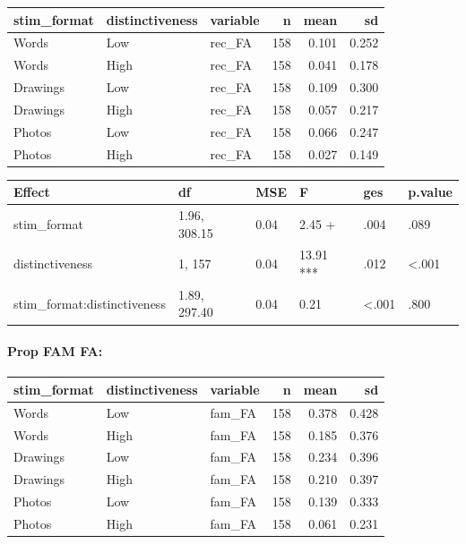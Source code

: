 \documentclass[
  11pt,
]{article}
\begin{document}
\begin{table}[!h]
\centering
\begin{tabular}{lllrrr}
\toprule
stim\_format & distinctiveness & variable & n & mean & sd\\
\midrule
Words & Low & rec\_FA & 158 & 0.101 & 0.252\\
Words & High & rec\_FA & 158 & 0.041 & 0.178\\
Drawings & Low & rec\_FA & 158 & 0.109 & 0.300\\
Drawings & High & rec\_FA & 158 & 0.057 & 0.217\\
Photos & Low & rec\_FA & 158 & 0.066 & 0.247\\
\addlinespace
Photos & High & rec\_FA & 158 & 0.027 & 0.149\\
\bottomrule
\end{tabular}
\end{table}

\begin{tabular}{l|l|l|l|l|l}
\hline
Effect & df & MSE & F & ges & p.value\\
\hline
stim\_format & 1.96, 308.15 & 0.04 & 2.45 + & .004 & .089\\
\hline
distinctiveness & 1, 157 & 0.04 & 13.91 *** & .012 & <.001\\
\hline
stim\_format:distinctiveness & 1.89, 297.40 & 0.04 & 0.21 & <.001 & .800\\
\hline
\end{tabular}

\newpage

\hypertarget{prop-fam-fa}{%
\paragraph{Prop FAM FA:}\label{prop-fam-fa}}

\begin{table}[!h]
\centering
\begin{tabular}{lllrrr}
\toprule
stim\_format & distinctiveness & variable & n & mean & sd\\
\midrule
Words & Low & fam\_FA & 158 & 0.378 & 0.428\\
Words & High & fam\_FA & 158 & 0.185 & 0.376\\
Drawings & Low & fam\_FA & 158 & 0.234 & 0.396\\
Drawings & High & fam\_FA & 158 & 0.210 & 0.397\\
Photos & Low & fam\_FA & 158 & 0.139 & 0.333\\
\addlinespace
Photos & High & fam\_FA & 158 & 0.061 & 0.231\\
\bottomrule
\end{tabular}
\end{table}
\end{document}
